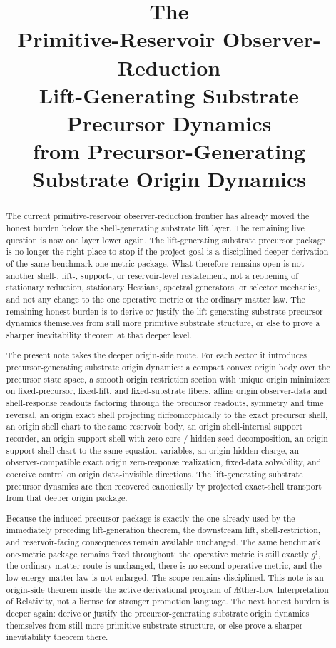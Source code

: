 \documentclass[11pt]{article}
\title{\textbf{The \TheoryName{}}\\[0.4em]
\large Primitive-Reservoir Observer-Reduction\\
\large Lift-Generating Substrate Precursor Dynamics\\
\large from Precursor-Generating Substrate Origin Dynamics}
\author{}
\date{}
\newcommand{\Aflow}{\AE{}ther-flow}
\newcommand{\TheoryName}{\Aflow{} Interpretation of Relativity}
\newcommand{\CompletedMetric}{g^{\sharp}}
\begin{document}
\maketitle

\begin{abstract}
The current primitive-reservoir observer-reduction frontier has already moved the honest burden below the shell-generating substrate lift layer. The remaining live question is now one layer lower again. The lift-generating substrate precursor package is no longer the right place to stop if the project goal is a disciplined deeper derivation of the same benchmark one-metric package. What therefore remains open is not another shell-, lift-, support-, or reservoir-level restatement, not a reopening of stationary reduction, stationary Hessians, spectral generators, or selector mechanics, and not any change to the one operative metric or the ordinary matter law. The remaining honest burden is to derive or justify the lift-generating substrate precursor dynamics themselves from still more primitive substrate structure, or else to prove a sharper inevitability theorem at that deeper level.

The present note takes the deeper origin-side route. For each sector it introduces precursor-generating substrate origin dynamics: a compact convex origin body over the precursor state space, a smooth origin restriction section with unique origin minimizers on fixed-precursor, fixed-lift, and fixed-substrate fibers, affine origin observer-data and shell-response readouts factoring through the precursor readouts, symmetry and time reversal, an origin exact shell projecting diffeomorphically to the exact precursor shell, an origin shell chart to the same reservoir body, an origin shell-internal support recorder, an origin support shell with zero-core / hidden-seed decomposition, an origin support-shell chart to the same equation variables, an origin hidden charge, an observer-compatible exact origin zero-response realization, fixed-data solvability, and coercive control on origin data-invisible directions. The lift-generating substrate precursor dynamics are then recovered canonically by projected exact-shell transport from that deeper origin package.

Because the induced precursor package is exactly the one already used by the immediately preceding lift-generation theorem, the downstream lift, shell-restriction, and reservoir-facing consequences remain available unchanged. The same benchmark one-metric package remains fixed throughout: the operative metric is still exactly \(\CompletedMetric\), the ordinary matter route is unchanged, there is no second operative metric, and the low-energy matter law is not enlarged. The scope remains disciplined. This note is an origin-side theorem inside the active derivational program of \TheoryName{}, not a license for stronger promotion language. The next honest burden is deeper again: derive or justify the precursor-generating substrate origin dynamics themselves from still more primitive substrate structure, or else prove a sharper inevitability theorem there.
\end{abstract}
\end{document}
